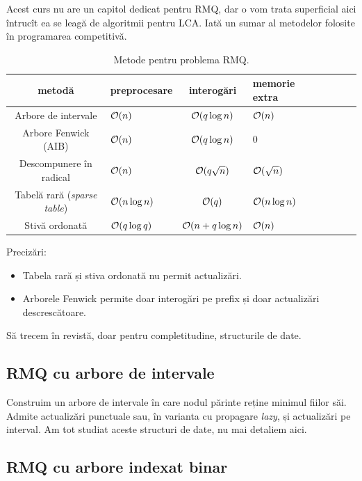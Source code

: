 \documentclass[../main.tex]{subfiles}
\begin{document}
Acest curs nu are un capitol dedicat pentru RMQ, dar o vom trata superficial aici întrucît ea se leagă de algoritmii pentru LCA. Iată un sumar al metodelor folosite în programarea competitivă.

\begin{table}[!htbp]
  \centering
  \begin{tabular}{SlSlSlSl}
    \textbf{metodă} & \textbf{preprocesare} & \textbf{interogări} & \textbf{memorie extra} \\
    \hline
    Arbore de intervale & $\mathcal{O}(n)$ & $\mathcal{O}(q \log n)$ & $\mathcal{O}(n)$ \\
    Arbore Fenwick (AIB) & $\mathcal{O}(n)$ & $\mathcal{O}(q \log n)$ & $0$ \\
    Descompunere în radical & $\mathcal{O}(n)$ & $\mathcal{O}(q \sqrt{n})$ & $\mathcal{O}(\sqrt{n})$ \\
    Tabelă rară (\textit{sparse table}) & $\mathcal{O}(n \log n)$ & $\mathcal{O}(q)$ & $\mathcal{O}(n \log n)$ \\
    Stivă ordonată & $\mathcal{O}(q \log q)$ & $\mathcal{O}(n + q \log n)$ & $\mathcal{O}(n)$ \\
    \hline
  \end{tabular}

  \caption{Metode pentru problema RMQ.}
\end{table}

Precizări:

\begin{itemize}
  \item Tabela rară și stiva ordonată nu permit actualizări.
  \item Arborele Fenwick permite doar interogări pe prefix și doar actualizări descrescătoare.
\end{itemize}

Să trecem în revistă, doar pentru completitudine, structurile de date.

\subsection{RMQ cu arbore de intervale}

Construim un arbore de intervale în care nodul părinte reține minimul fiilor săi. Admite actualizări punctuale sau, în varianta cu propagare \textit{lazy}, și actualizări pe interval. Am tot studiat aceste structuri de date, nu mai detaliem aici.

\subsection{RMQ cu arbore indexat binar}
\end{document}
